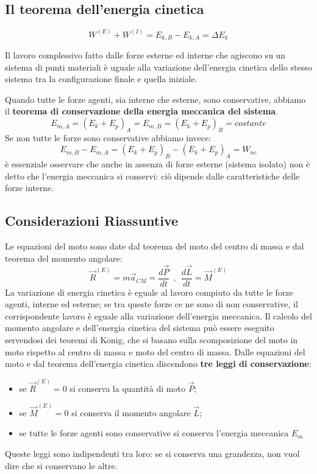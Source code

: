 \documentclass{article}
\numberwithin{equation}{subsection}
\begin{document}
\subsection{Il teorema dell'energia cinetica}
\begin{equation}
    W^{(E)}+W^{(I)} = E_{k,B} - E_{k,A}= \Delta E_k
\end{equation}
\begin{shaded}
    Il lavoro complessivo fatto dalle forze esterne ed interne che agiscono su un sistema di punti materiali è uguale alla variazione dell'energia cinetica dello stesso sistema tra la configurazione finale e quella iniziale.
\end{shaded}
\noindent
Quando tutte le forze agenti, sia interne che esterne, sono conservative, abbiamo il \textbf{teorema di conservazione della energia meccanica del sistema}.
\begin{equation}
    E_{m,A}= (E_k + E_p)_A=E_{m,B} = (E_k+E_p)_B=costante
\end{equation}
Se non tutte le forze sono conservative abbiamo invece:
\begin{equation}
    E_{m,B}-E_{m,A} = (E_k+E_p)_B-(E_k+E_p)_A=W_{nc}
\end{equation}
è essenziale osservare che anche in assenza di forze esterne (sistema isolato) non è detto che l'energia meccanica si conservi: ciò dipende dalle caratteristiche delle forze interne.
\subsection{Considerazioni Riassuntive}
Le equazioni del moto sono date dal teorema del moto del centro di massa e dal teorema del momento angolare:
\begin{equation}
    \vec{R}^{(E)}=m\vec{a}_{CM}=\frac{d\vec{P}}{dt} \ \ , \ \ \frac{d\vec{L}}{dt}=\vec{M}^{(E)}
\end{equation}
La variazione di energia cinetica è eguale al lavoro compiuto da tutte le forze agenti, interne ed esterne; se tra queste forze ce ne sono di non conservative, il corrispondente lavoro è eguale alla variazione dell'energia meccanica. Il calcolo del momento angolare e dell'energia cinetica del sistema può essere eseguito servendosi dei teoremi di Konig, che si basano sulla scomposizione del moto in moto rispetto al centro di massa e moto del centro di massa. Dalle equazioni del moto e dal teorema dell'energia cinetica discendono \textbf{tre leggi di conservazione}:
\begin{itemize}
    \item se $\vec{R}^{(E)}=0$ si conserva la quantità di moto $\vec{P}$;
    \item se $\vec{M}^{(E)}=0$ si conserva il momento angolare $\vec{L}$;
    \item se tutte le forze agenti sono conservative si conserva l'energia meccanica $E_m$
\end{itemize}
Queste leggi sono indipendenti tra loro: se si conserva una grandezza, non vuol dire che si conservano le altre.
\end{document}
